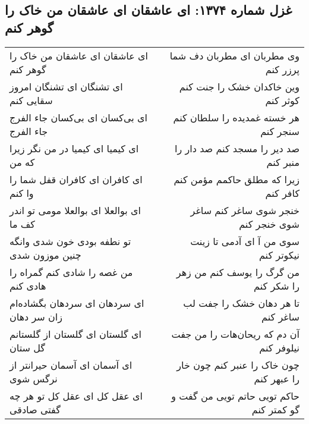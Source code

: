 \begin{center}
\section*{غزل شماره ۱۳۷۴: ای عاشقان ای عاشقان من خاک را گوهر کنم}
\label{sec:1374}
\begin{longtable}{l p{0.5cm} r}
ای عاشقان ای عاشقان من خاک را گوهر کنم
&&
وی مطربان ای مطربان دف شما پرزر کنم
\\
ای تشنگان ای تشنگان امروز سقایی کنم
&&
وین خاکدان خشک را جنت کنم کوثر کنم
\\
ای بی‌کسان ای بی‌کسان جاء الفرج جاء الفرج
&&
هر خسته غمدیده را سلطان کنم سنجر کنم
\\
ای کیمیا ای کیمیا در من نگر زیرا که من
&&
صد دیر را مسجد کنم صد دار را منبر کنم
\\
ای کافران ای کافران قفل شما را وا کنم
&&
زیرا که مطلق حاکمم مؤمن کنم کافر کنم
\\
ای بوالعلا ای بوالعلا مومی تو اندر کف ما
&&
خنجر شوی ساغر کنم ساغر شوی خنجر کنم
\\
تو نطفه بودی خون شدی وانگه چنین موزون شدی
&&
سوی من آ ای آدمی تا زینت نیکوتر کنم
\\
من غصه را شادی کنم گمراه را هادی کنم
&&
من گرگ را یوسف کنم من زهر را شکر کنم
\\
ای سردهان ای سردهان بگشاده‌ام زان سر دهان
&&
تا هر دهان خشک را جفت لب ساغر کنم
\\
ای گلستان ای گلستان از گلستانم گل ستان
&&
آن دم که ریحان‌هات را من جفت نیلوفر کنم
\\
ای آسمان ای آسمان حیرانتر از نرگس شوی
&&
چون خاک را عنبر کنم چون خار را عبهر کنم
\\
ای عقل کل ای عقل کل تو هر چه گفتی صادقی
&&
حاکم تویی حاتم تویی من گفت و گو کمتر کنم
\\
\end{longtable}
\end{center}

